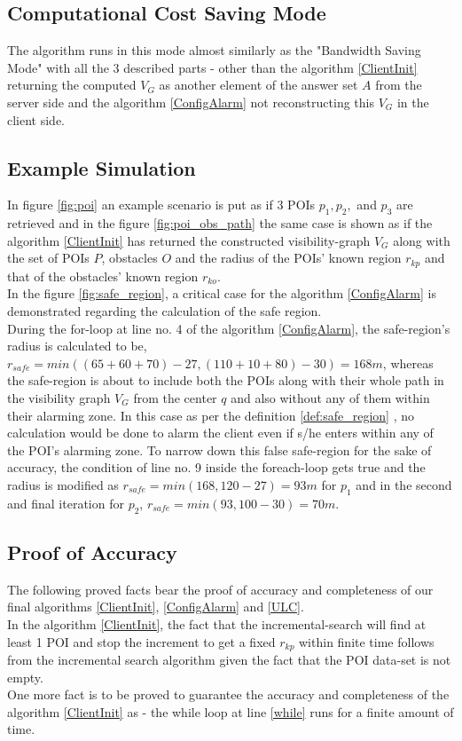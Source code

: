 \documentclass{sig-alternate}
\begin{document}
\subsection{Computational Cost Saving Mode}
The algorithm runs in this mode almost similarly as the "Bandwidth Saving Mode" with all the 3 described parts - other than the algorithm \ref{ClientInit} returning the computed $V_G$ as another element of the answer set $A$ from the server side and the algorithm \ref{ConfigAlarm} not reconstructing this $V_G$ in the client side.

\subsection{Example Simulation} \label{saos_example_simu}
In figure \ref{fig:poi} an example scenario is put as if 3 POIs $p_1, p_2,$ and $p_3$ are retrieved and in the figure \ref{fig:poi_obs_path} the same case is shown as if the algorithm \ref{ClientInit} has returned the constructed visibility-graph $V_G$ along with the set of POIs $P$, obstacles $O$ and the radius of the POIs' known region $r_{kp}$ and that of the obstacles' known region $r_{ko}$.
\\ In the figure \ref{fig:safe_region}, a critical case for the algorithm \ref{ConfigAlarm} is demonstrated regarding the calculation of the safe region.
\\During the for-loop at line no. 4 of the algorithm \ref{ConfigAlarm}, the safe-region's radius is calculated to be,
\\$r_{safe} = min( (65+60+70)-27, (110+10+80)-30 ) = 168m$, whereas the safe-region is about to include both the POIs along with their whole path in the visibility graph $V_G$ from the center $q$ and also without any of them within their alarming zone. In this case as per the definition \ref{def:safe_region} , no calculation would be done to alarm the client even if s/he enters within any of the POI's alarming zone. To narrow down this false safe-region for the sake of accuracy, the condition of line no. 9 inside the foreach-loop gets true and the radius is modified as $r_{safe} = min(168, 120-27) = 93m$ for $p_1$ and in the second and final iteration for $p_2$, $r_{safe} = min( 93, 100-30) = 70m$.

\subsection{Proof of Accuracy}
The following proved facts bear the proof of accuracy and completeness of our final algorithms \ref{ClientInit}, \ref{ConfigAlarm} and \ref{ULC}.\\
In the algorithm \ref{ClientInit}, the fact that the incremental-search will find at least 1 POI and stop the increment to get a fixed $r_{kp}$ within finite time follows from the incremental search algorithm given the fact that the POI data-set is not empty.
\\One more fact is to be proved to guarantee the accuracy and completeness of the algorithm \ref{ClientInit} as - the while loop at line \ref{while} runs for a finite amount of time.
\end{document}
